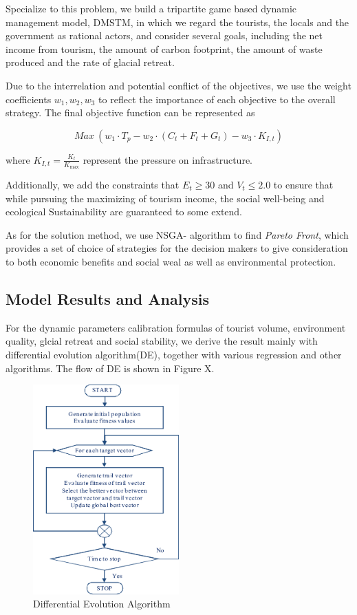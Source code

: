 \documentclass{mcmthesis}
\begin{document}
Specialize to this problem, we build a tripartite game based dynamic management model, DMSTM, in which 
we regard the tourists, the locals and the government as rational actors,
and consider several goals, including the net income from tourism, the amount of carbon footprint, 
the amount of waste produced and the rate of glacial retreat. 

Due to the interrelation and potential conflict of the objectives, we use the weight coefficients $w_1, w_2, w_3$ to reflect 
the importance of each objective to the overall strategy. The final objective function can be represented as 

\begin{equation}
  Max \ (w_1 \cdot T_p - w_2 \cdot (C_t + F_t + G_t) - w_3 \cdot K_{I,t})
\end{equation}

where $K_{I,t}=\frac{K_t}{K_{\text{max}}}$ represent the pressure on infrastructure.

Additionally, we add the constraints that $E_t \geq 30$ and $V_t \leq 2.0$ to ensure that
while pursuing the maximizing of tourism income, the social well-being and ecological Sustainability
are guaranteed to some extend.

As for the solution method, we use NSGA-\uppercase\expandafter{} algorithm to find
\emph{Pareto Front}, which provides a set of choice of strategies for the decision makers to give consideration to
both economic benefits and social weal as well as environmental protection.

\subsection{Model Results and Analysis}
For the dynamic parameters calibration formulas of tourist volume, environment quality, glcial retreat and social stability, we derive the result mainly with 
differential evolution algorithm(DE), together with various regression and other algorithms. The flow of DE is shown in Figure X.
\begin{figure}[H]
  \centering
  \includegraphics[width=0.5\textwidth]{figures/de.png}
  \caption{Differential Evolution Algorithm}
  \label{Figure.X}
\end{figure}
\end{document}
